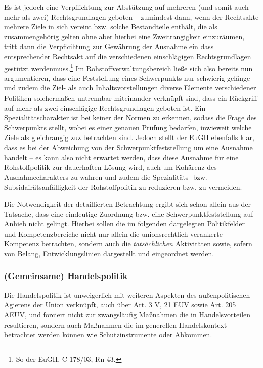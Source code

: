 \documentclass[12pt,a4paper,oneside]{book} %
\begin{document}
	Es ist jedoch eine Verpflichtung zur Abstützung auf mehreren (und somit auch mehr als zwei) Rechtsgrundlagen geboten -- zumindest dann, wenn der Rechtsakte mehrere Ziele in sich vereint bzw. solche Bestandteile enthält, die als zusammengehörig gelten ohne aber hierbei eine Zweitrangigkeit einzuräumen, tritt dann die Verpflcihtung zur Gewährung der Ausnahme ein dass entsprechender Rechtsakt auf die \glqq verschiedenen einschlägigen Rechtsgrundlagen gestützt werden\grqq muss.\footnote{So der EuGH, C-178/03, Rn 43.} Im Rohstoffverwaltungsbereich ließe sich also bereits nun argumentieren, dass eine Feststellung eines Schwerpunkts nur schwierig gelänge und zudem die Ziel- als auch Inhaltsvorstellungen diverse Elemente verschiedener Politiken solchermaßen untrennbar miteinander verknüpft sind, dass ein Rückgriff auf mehr als zwei einschlägige Rechtsgrundlagen geboten ist. Ein Spezialitätscharakter ist bei keiner der Normen zu erkennen, sodass die Frage des Schwerpunkts stellt, wobei es einer genauen Prüfung bedarfen, inwieweit welche Ziele als gleichrangig zuz betrachten sind. Jedoch stellt der EuGH ebenfalls klar, dass es bei der Abweichung von der Schwerpunktfeststellung um eine Ausnahme handelt -- es kann also nicht erwartet werden, dass diese Ausnahme für eine Rohstoffpolitik zur dauerhaften Lösung wird, auch um Kohärenz des Ausnahmecharakters zu wahren und zudem die Spezialitäts- bzw. Subsidairätsanfälligkeit der Rohstoffpolitik zu reduzieren bzw. zu vermeiden.
	
	Die Notwendigkeit der detaillierten Betrachtung ergibt sich schon allein aus der Tatsache, dass eine eindeutige Zuordnung bzw. eine Schwerpunktfeststellung auf Anhieb nicht gelingt. Hierbei sollen die im folgenden dargelegten Politikfelder und Kompetenzbereiche nicht nur allein die unionsrechtlich verankerte Kompetenz betrachten, sondern auch die \textit{tatsächlichen} Aktivitäten sowie, sofern von Belang, Entwicklungslinien dargestellt und eingeordnet werden.
	
	\subsubsection{(Gemeinsame) Handelspolitik}
	
	
Die Handelspolitik ist unweigerlich mit weiteren Aspekten des außenpolitischen Agierens der Union verknüpft, auch über Art. 3 V, 21 EUV sowie Art. 205 AEUV, und forciert nicht zur zwangsläufig Maßnahmen die in Handelsvorteilen resultieren, sondern auch Maßnahmen die im generellen Handelskontext betrachtet werden können wie Schutzinstrumente oder Abkommen.\autocite{Callies/Ruffert, Art. 206, Rn 3.}
\end{document}
